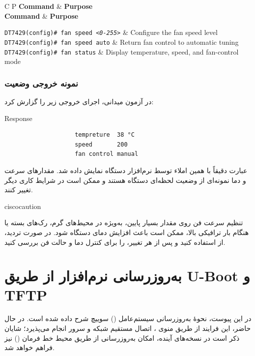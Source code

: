 \documentclass[11pt,letterpaper]{report}
\newenvironment{cautionbox}[1]{%
	\begin{noticebox}[title={\textbf{\faExclamationTriangle\ #1}}]{ciscocaution}
	}{%
	\end{noticebox}
}
\newenvironment{cmdtable}[1]{%
	\begin{LTR}
		\captionsetup{type=table}
		\captionof{table}{#1}
		\begin{longtable}{C P}
			\toprule
			\textbf{Command} & \textbf{Purpose} \\
			\midrule
			\endfirsthead
			\toprule
			\textbf{Command} & \textbf{Purpose} \\
			\midrule
			\endhead
			\bottomrule
			\endfoot
		}{%
		\end{longtable}
	\end{LTR}
}
\begin{document}
	\begin{cmdtable}{Fan Speed Command}
		\texttt{DT7429(config)\# fan speed \textit{\textless 0-255\textgreater}} &
		Configure the fan speed level
		\\
		\texttt{DT7429(config)\# fan speed auto} &
		Return fan control to automatic tuning
		\\
		\texttt{DT7429(config)\# fan status} &
		Display temperature, speed, and fan-control mode
	\end{cmdtable}

	\subsection{نمونه خروجی وضعیت}

	در آزمون میدانی، اجرای  خروجی زیر را گزارش کرد:

	\begin{latin}
		\begin{cliexample}{Response}
			\begin{verbatim}
					tempreture  38 °C
					speed       200
					fan control manual
			\end{verbatim}
		\end{cliexample}
	\end{latin}

	عبارت  دقیقاً با همین املاء توسط نرم‌افزار دستگاه
	نمایش داده شد. مقدارهای سرعت و دما نمونه‌ای از وضعیت لحظه‌ای دستگاه
	هستند و ممکن است در شرایط کاری دیگر تغییر کنند.

	\begin{cautionbox}{هشدار}
		تنظیم سرعت فن روی مقدار بسیار پایین، به‌ویژه در محیط‌های گرم، رک‌های
		بسته یا هنگام بار ترافیکی بالا، ممکن است باعث افزایش دمای دستگاه شود.
		در صورت تردید، از  استفاده کنید و پس از هر
		تغییر،  را برای کنترل دما و حالت فن بررسی کنید.
	\end{cautionbox}


	\appendix
	\chapter{به‌روزرسانی نرم‌افزار از طریق U-Boot و TFTP}

	در این پیوست، نحوهٔ به‌روزرسانی سیستم‌عامل () سوییچ شرح داده شده است. در حال حاضر، این فرایند از طریق منوی ، اتصال مستقیم شبکه و سرور  انجام می‌پذیرد؛ شایان ذکر است در نسخه‌های آینده، امکان به‌روزرسانی از طریق محیط خط فرمان () نیز فراهم خواهد شد.
\end{document}
